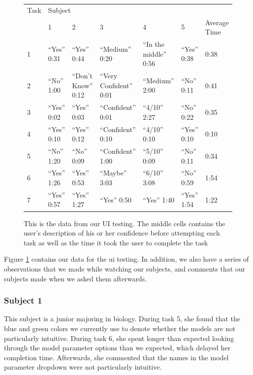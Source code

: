 \documentclass[letterpaper,10pt, onecolumn, draftclsnofoot]{IEEEtran}
\begin{document}
\begin{figure}
\begin{tabularx}{\textwidth}{|X|X|X|X|X|X|X|}
\hline
Task & \multicolumn{6}{X|}{Subject} \\
\cline{2-7}
& 1 & 2 & 3 & 4 & 5 & Average Time \\
\hline
1    & ``Yes'' 0:31 & ``Yes'' 0:44        & ``Medium'' 0:20         & ``In the middle'' 0:56 & ``Yes'' 0:38 & 0:38 \\
\hline
2    & ``No'' 1:00  & ``Don't Know'' 0:12 & ``Very Confident'' 0:01 & ``Medium'' 2:00        & ``No'' 0:11  & 0:41 \\
\hline
3    & ``Yes'' 0:02 & ``Yes'' 0:03        & ``Confident'' 0:01      & ``4/10'' 2:27          & ``No'' 0:22  & 0:35 \\
\hline
4    & ``Yes'' 0:10 & ``Yes'' 0:12        & ``Confident'' 0:10      & ``4/10'' 0:10          & ``Yes'' 0:10 & 0:10 \\
\hline
5    & ``No'' 1:20  & ``No'' 0:09         & ``Confident'' 1:00      & ``5/10'' 0:09          & ``No'' 0:11  & 0:34 \\
\hline
6    & ``Yes'' 1:26 & ``Yes'' 0:53        & ``Maybe'' 3:03          & ``6/10'' 3:08          & ``No'' 0:59  & 1:54 \\
\hline
7    & ``Yes'' 0:57 & ``Yes'' 1:27        & ``Yes'' 0:50            & ``Yes'' 1:40           & ``Yes'' 1:54 & 1:22 \\
\hline

\end{tabularx}
\caption{This is the data from our UI testing. The middle cells contains the user's description of his or her confidence before attempting each task as well as the time it took the user to complete the task}
\label{fig:uiTestData1}
\end{figure}

Figure \ref{fig:uiTestData1} contains our data for the ui testing. In addition, we also have a series of observations that we made while watching our subjects, and comments that our subjects made when we asked them afterwards.

\subsubsection{Subject 1}
This subject is a junior majoring in biology. During task 5, she found that the blue and green colors we currently use to denote whether the models are not particularly intuitive. During task 6, she spent longer than expected looking through the model parameter options than we expected, which delayed her completion time. Afterwards, she commented that the names in the model parameter dropdown were not particularly intuitive.
\end{document}
